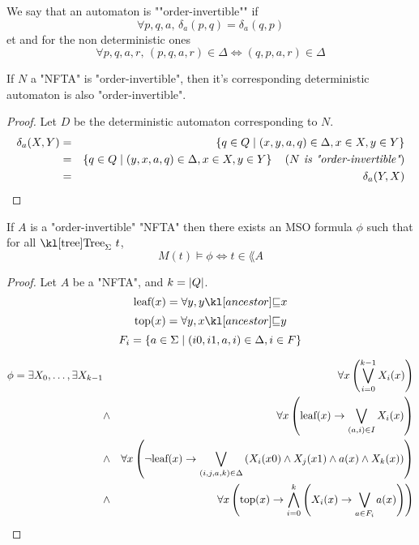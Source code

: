 \documentclass{article}
\begin{document}
\begin{definition}
	We say that an automaton is ""order-invertible"" if
	$$ \forall p,q,a,\, \delta_a (p,q) = \delta_a (q,p) $$ et
	and for the non deterministic ones
	$$ \forall p,q,a,r,\, (p,q,a,r) \in \Delta \iff  (q,p,a,r) \in \Delta $$

\end{definition}


\begin{lemma}
	If $N$ a "NFTA" is "order-invertible", then it's corresponding deterministic automaton is also "order-invertible".
\end{lemma}

\begin{proof}
	Let $D$ be the deterministic automaton corresponding to $N$.
	\begin{eqnarray*}
		\delta_a (X,Y) &=& \left\{q \in Q \mid (x,y,a,q) \in \Delta, x \in X, y \in Y\right\} \\
		&=& \left\{q \in Q \mid (y,x,a,q) \in \Delta, x \in X, y \in Y\right\}  \quad\left(\textit{$N$ is "order-invertible"}\right) \\
		&=& \delta_a (Y,X)
	\end{eqnarray*}
\end{proof}

\begin{theorem}
	If $A$ is a "order-invertible" "NFTA"  then there exists an MSO formula $\phi$ such that for all $\tree_{\Sigma} \ t$,
	$$ M(t) \models \phi \iff t \in \lang A$$
\end{theorem}

\begin{proof}
	\todo {}

	Let $A$ be a "NFTA", and $k = \left|Q\right|$.
	$$\text{leaf} (x) = \forall y, \ancestor y x$$
	$$\text{top} (x) = \forall y, \ancestor x y$$
	$$F_i = \left\{a \in \Sigma \mid (i0,i1,a,i) \in \Delta, i \in F\right\}$$


	\begin{eqnarray*}
		\phi = \exists X_0,\ldots, \exists X_{k-1} &\ & \forall x \left( \bigvee_{i=0}^{k-1} X_i(x) \right) \\
		&\land& \forall x \left( \text{leaf} (x) \rightarrow \bigvee_{(a,i)\in I}  X_i(x)   \right) \\
		&\land& \forall x \left(\lnot \text{leaf}(x) \rightarrow \bigvee_{(i,j,a,k)\in \Delta}  \left(X_i(x0) \land X_j(x1) \land a(x) \land X_k(x)\right)\right) \\
		&\land& \forall x \left(\text{top}(x) \rightarrow \bigwedge_{i= 0}^k \left( X_i(x) \rightarrow \bigvee_{a \in F_i} a(x) \right)\right)
	\end{eqnarray*}

\end{proof}





\end{document}
